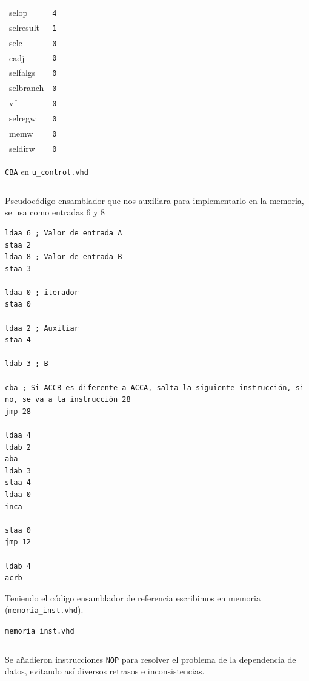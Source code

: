 \documentclass{IEEEtran}
\newenvironment{code}{\captionsetup{type=listing}}{}
\begin{document}
\begin{itemize}
\begin{table}[htbp]
\begin{tabular}{ll}
selop & \texttt{4}\\
selresult & \texttt{1}\\
selc & \texttt{0}\\
cadj & \texttt{0}\\
selfalgs & \texttt{0}\\
selbranch & \texttt{0}\\
vf & \texttt{0}\\
selregw & \texttt{0}\\
memw & \texttt{0}\\
seldirw & \texttt{0}\\
\hline
\end{tabular}
\end{table}
\begin{code}
\caption{\texttt{CBA} en \texttt{u\_control.vhd}}
\inputminted[firstline=253, lastline=271]{vhdl}{../Risc/u_control.vhd}
\end{code}
\end{itemize}

\begin{code}
\caption{Pseudocódigo ensamblador que nos auxiliara para implementarlo en la memoria, se usa como entradas 6 y 8}
\begin{verbatim}
ldaa 6 ; Valor de entrada A
staa 2
ldaa 8 ; Valor de entrada B
staa 3

ldaa 0 ; iterador
staa 0

ldaa 2 ; Auxiliar
staa 4

ldab 3 ; B

cba ; Si ACCB es diferente a ACCA, salta la siguiente instrucción, si no, se va a la instrucción 28
jmp 28

ldaa 4
ldab 2
aba
ldab 3
staa 4
ldaa 0
inca

staa 0
jmp 12

ldab 4
acrb
\end{verbatim}
\end{code}

Teniendo el código ensamblador de referencia escribimos en memoria (\texttt{memoria\_inst.vhd}).
\begin{code}
\caption{\texttt{memoria\_inst.vhd}}
\inputminted{vhdl}{../Risc/memoria_inst.vhd}
\end{code}

Se añadieron instrucciones \texttt{NOP} para resolver el problema de la dependencia de datos, evitando así diversos retrasos e inconsistencias.
\end{document}
